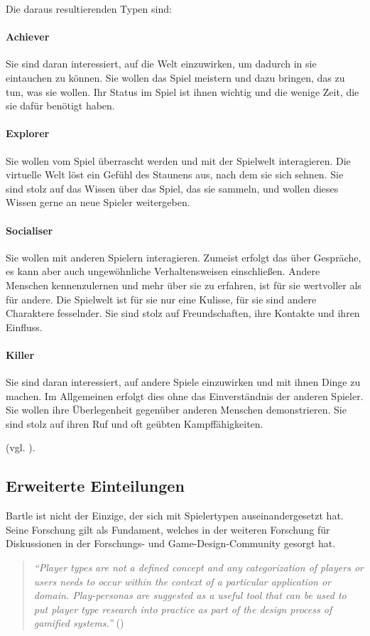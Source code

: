 Die daraus resultierenden Typen sind:
\paragraph{Achiever}
Sie sind daran interessiert, auf die Welt einzuwirken, um dadurch in sie eintauchen zu können. Sie wollen das Spiel meistern und dazu bringen, das zu tun, was sie wollen. Ihr Status im Spiel ist ihnen wichtig und die wenige Zeit, die sie dafür benötigt haben.

\paragraph{Explorer}
Sie wollen vom Spiel überrascht werden und mit der Spielwelt interagieren. Die virtuelle Welt löst ein Gefühl des Staunens aus, nach dem sie sich sehnen. Sie sind stolz auf das Wissen über das Spiel, das sie sammeln, und wollen dieses Wissen gerne an neue Spieler weitergeben.

\paragraph{Socialiser}
Sie wollen mit anderen Spielern interagieren. Zumeist erfolgt das über Gespräche, es kann aber auch ungewöhnliche Verhaltensweisen einschließen. Andere Menschen kennenzulernen und mehr über sie zu erfahren, ist für sie wertvoller als für andere. Die Spielwelt ist für sie nur eine Kulisse, für sie sind andere Charaktere fesselnder. Sie sind stolz auf Freundschaften, ihre Kontakte und ihren Einfluss.

\paragraph{Killer}
Sie sind daran interessiert, auf andere Spiele einzuwirken und mit ihnen Dinge zu machen. Im Allgemeinen erfolgt dies ohne das Einverständnis der anderen Spieler. Sie wollen ihre Überlegenheit gegenüber anderen Menschen demonstrieren. Sie sind stolz auf ihren Ruf und oft geübten Kampffähigkeiten.

(vgl. \cite{bartle_hearts_1996}).

\subsection{Erweiterte Einteilungen}
Bartle ist nicht der Einzige, der sich mit Spielertypen auseinandergesetzt hat. Seine Forschung gilt als Fundament, welches in der weiteren Forschung für Diskussionen in der Forschungs- und Game-Design-Community gesorgt hat. 
\begin{quote}
    \textit{
        \enquote{Player types are not a defined concept and any categorization of players or users needs to occur within the context of a particular application or domain. Play-personas are suggested as a useful tool that can be used to put player type research into practice as part of the design process of gamified systems.}
    } 
    (\cite{dixon_player_nodate})
\end{quote}

